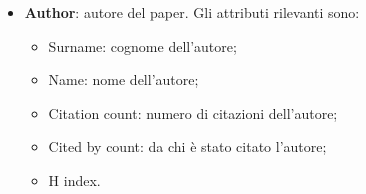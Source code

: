 \begin{itemize}
    \item \textbf{Author}: autore del paper. Gli attributi rilevanti sono:
    \begin{itemize}
        \item Surname: cognome dell'autore;
        \item Name: nome dell'autore;
        \item Citation count: numero di citazioni dell'autore;
        \item Cited by count: da chi è stato citato l'autore;
        \item H index.
    \end{itemize}
\end{itemize}
